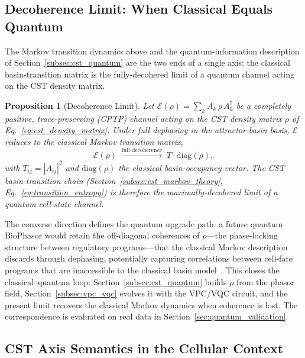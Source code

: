 \documentclass[preprint,12pt,amsmath,amssymb,superscriptaddress,floatfix]{revtex4-2}
\newtheorem{proposition}{Proposition}[section]
\begin{document}
\subsection{Decoherence Limit: When Classical Equals Quantum}
\label{subsec:cst_decoherence}

The Markov transition dynamics above and the quantum-information description of
Section~\ref{subsec:cst_quantum} are the two ends of a single axis: the
classical basin-transition matrix is the fully-decohered limit of a quantum
channel acting on the CST density matrix.

\begin{proposition}[Decoherence Limit]
\label{prop:cst_decoherence}
Let $\mathcal{E}(\rho)=\sum_k A_k\,\rho\,A_k^\dagger$ be a completely positive,
trace-preserving (CPTP) channel acting on the CST density matrix $\rho$ of
Eq.~\eqref{eq:cst_density_matrix}. Under full dephasing in the attractor-basin
basis, $\mathcal{E}$ reduces to the classical Markov transition matrix,
\begin{equation}
  \mathcal{E}(\rho)\;\xrightarrow{\text{full decoherence}}\;
  T\cdot\mathrm{diag}(\rho),
\end{equation}
with $T_{ij}=|A_{ij}|^2$ and $\mathrm{diag}(\rho)$ the classical basin-occupancy
vector. The CST basin-transition chain
(Section~\ref{subsec:cst_markov_theory}, Eq.~\eqref{eq:transition_entropy}) is
therefore the maximally-decohered limit of a quantum cell-state channel.
\end{proposition}

\noindent
The converse direction defines the quantum upgrade path: a future quantum
BioPhasor would retain the off-diagonal coherences of $\rho$---the phase-locking
structure between regulatory programs---that the classical Markov description
discards through dephasing, potentially capturing correlations between cell-fate
programs that are inaccessible to the classical basin
model~\cite{cerezo2021variational}. This closes the classical--quantum loop:
Section~\ref{subsec:cst_quantum} builds $\rho$ from the phasor field,
Section~\ref{subsec:vpc_vqc} evolves it with the VPC/VQC circuit, and the
present limit recovers the classical Markov dynamics when coherence is lost. The
correspondence is evaluated on real data in
Section~\ref{sec:quantum_validation}.

\subsection{CST Axis Semantics in the Cellular Context}
\end{document}
